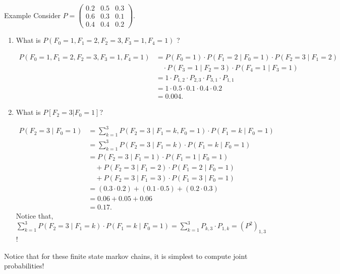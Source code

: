 \documentclass[a4paper]{article}
\begin{document}
\begin{note}{Example} 
  Consider $P = \begin{pmatrix}
0.2 & 0.5 & 0.3 \\
0.6 & 0.3 & 0.1 \\
0.4 & 0.4 & 0.2
\end{pmatrix}$.
\begin{enumerate}
  \item What is $P(F_0 = 1, F_1 = 2, F_2 = 3, F_3 = 1, F_4 = 1)$ ?

\begin{align*}
P(F_0 = 1, F_1 = 2, F_2 = 3, F_3 = 1, F_4 = 1) 
&= P(F_0 = 1) \cdot P(F_1 = 2 \mid F_0 = 1) \cdot P(F_2 = 3 \mid F_1 = 2) \\
&\quad \cdot P(F_3 = 1 \mid F_2 = 3) \cdot P(F_4 = 1 \mid F_3 = 1) \\
&= 1 \cdot P_{1,2} \cdot P_{2,3} \cdot P_{3,1} \cdot P_{1,1} \\
&= 1 \cdot 0.5 \cdot 0.1 \cdot 0.4 \cdot 0.2 \\
&= 0.004.
\end{align*} 

\item What is $P[F_2 =3|F_0 = 1]$?

\begin{align*}
P(F_2 = 3 \mid F_0 = 1) 
&= \sum_{k=1}^{3} P(F_2 = 3 \mid F_1 = k, F_0 = 1) \cdot P(F_1 = k \mid F_0 = 1) \\
&= \sum_{k=1}^{3} P(F_2 = 3 \mid F_1 = k) \cdot P(F_1 = k \mid F_0 = 1) \\
&= P(F_2 = 3 \mid F_1 = 1) \cdot P(F_1 = 1 \mid F_0 = 1) \\
&\quad + P(F_2 = 3 \mid F_1 = 2) \cdot P(F_1 = 2 \mid F_0 = 1) \\
&\quad + P(F_2 = 3 \mid F_1 = 3) \cdot P(F_1 = 3 \mid F_0 = 1) \\
&= (0.3 \cdot 0.2) + (0.1 \cdot 0.5) + (0.2 \cdot 0.3) \\
&= 0.06 + 0.05 + 0.06 \\
&= 0.17.
\end{align*}
Notice that, $\sum_{k=1}^{3} P(F_2 = 3 \mid F_1 = k) \cdot P(F_1 = k \mid F_0 = 1) = \sum_{k=1}^{3} P_{k,3} \cdot P_{1,k} = (P^{2})_{1,3}$!
\end{enumerate}
\begin{remark}
      Notice that for these finite state markov chains, it is simplest to compute joint probabilities!
\end{remark}
\end{note}
\end{document}
